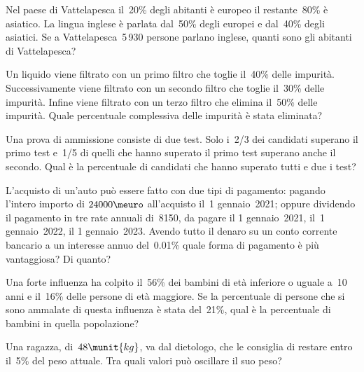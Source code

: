 \begin{htmulticols}{2}
\begin{esercizio}
Nel paese di Vattelapesca il~20\% degli abitanti è europeo il
restante~80\% è asiatico. La lingua inglese è parlata dal~50\% degli
europei e dal~40\% degli asiatici. Se a Vattelapesca~5\,930 persone
parlano inglese, quanti sono gli abitanti di Vattelapesca?
\end{esercizio}

\begin{esercizio}
Un liquido viene filtrato con un primo filtro che toglie il~40\%
delle impurità. Successivamente viene filtrato con un secondo filtro
che toglie il~30\% delle impurità. Infine viene filtrato con un terzo
filtro che elimina il~50\% delle impurità. Quale percentuale
complessiva delle impurità è stata eliminata?\\
\end{esercizio}

\begin{esercizio}
Una prova di ammissione consiste di due test. Solo i~2/3 dei
candidati superano il primo test e~1/5 di quelli che hanno superato il
primo test superano anche il secondo. Qual è la percentuale di
candidati che hanno superato tutti e due i test?
\end{esercizio}

\begin{esercizio}
L'acquisto di un'auto può essere fatto con due tipi di pagamento: pagando
l'intero importo di \(24000\meuro\) all'acquisto il~1{\textdegree} 
gennaio~2021; oppure
dividendo il pagamento in tre rate annuali di~8150, da pagare il
1{\textdegree} gennaio~2021, il~1{\textdegree} gennaio~2022, il
1{\textdegree} gennaio~2023. Avendo tutto il denaro su un conto
corrente bancario a un interesse annuo del~0.01\% quale forma di pagamento
è più vantaggiosa? Di quanto?
\end{esercizio}

\begin{esercizio}
Una forte influenza ha colpito il~56\% dei bambini di età
inferiore o uguale a~10 anni e il~16\% delle persone di età maggiore.
Se la percentuale di persone che si sono ammalate di questa influenza
è stata del~21\%, qual è la percentuale di bambini in quella
popolazione?
\end{esercizio}

\begin{esercizio}
Una ragazza, di~\(48\munit{kg}\), va dal dietologo, che
le consiglia di restare entro il~5\% del peso attuale. Tra
quali valori può oscillare il suo peso?
\end{esercizio}


\end{htmulticols}
